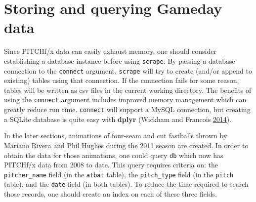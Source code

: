 \documentclass[12pt,]{isuthesis}
\newenvironment{Shaded}{\begin{snugshade}}{\end{snugshade}}
\newcommand{\KeywordTok}[1]{\textcolor[rgb]{0.13,0.29,0.53}{\textbf{{#1}}}}
\newcommand{\DataTypeTok}[1]{\textcolor[rgb]{0.13,0.29,0.53}{{#1}}}
\newcommand{\StringTok}[1]{\textcolor[rgb]{0.31,0.60,0.02}{{#1}}}
\newcommand{\CommentTok}[1]{\textcolor[rgb]{0.56,0.35,0.01}{\textit{{#1}}}}
\newcommand{\OtherTok}[1]{\textcolor[rgb]{0.56,0.35,0.01}{{#1}}}
\newcommand{\NormalTok}[1]{{#1}}
\begin{document}
\section{Storing and querying Gameday
data}\label{storing-and-querying-gameday-data}

Since PITCHf/x data can easily exhaust memory, one should consider
establishing a database instance before using \texttt{scrape}. By
passing a database connection to the \texttt{connect} argument,
\texttt{scrape} will try to create (and/or append to existing) tables
using that connection. If the connection fails for some reason, tables
will be written as csv files in the current working directory. The
benefits of using the \texttt{connect} argument includes improved memory
management which can greatly reduce run time. \texttt{connect} will
support a MySQL connection, but creating a SQLite database is quite easy
with \textbf{dplyr} (Wickham and Francois
\protect\hyperlink{ref-dplyr}{2014}).

\begin{Shaded}
\end{Shaded}

In the later sections, animations of four-seam and cut fastballs thrown
by Mariano Rivera and Phil Hughes during the 2011 season are created. In
order to obtain the data for those animations, one could query
\texttt{db} which now has PITCHf/x data from 2008 to date. This query
requires criteria on: the \texttt{pitcher\_name} field (in the
\texttt{atbat} table), the \texttt{pitch\_type} field (in the
\texttt{pitch} table), and the \texttt{date} field (in both tables). To
reduce the time required to search those records, one should create an
index on each of these three fields.

\begin{Shaded}
\end{Shaded}
\end{document}
